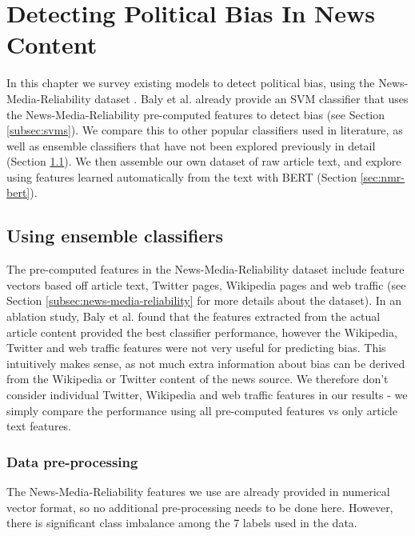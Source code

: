 \chapter{Detecting Political Bias In News Content} \label{chap:ensemble-bert}


In this chapter we survey existing models to detect political bias, using the News-Media-Reliability dataset \cite{news-media-reliability}. Baly et al. already provide an SVM classifier that uses the News-Media-Reliability pre-computed features to detect bias (see Section \ref{subsec:svms}). We compare this to other popular classifiers used in literature, as well as ensemble classifiers that have not been explored previously in detail (Section \ref{sec:nmr-ensemble}). We then assemble our own dataset of raw article text, and explore using features learned automatically from the text with BERT (Section \ref{sec:nmr-bert}).

\section{Using ensemble classifiers} \label{sec:nmr-ensemble}

The pre-computed features in the News-Media-Reliability dataset include feature vectors based off article text, Twitter pages, Wikipedia pages and web traffic (see Section \ref{subsec:news-media-reliability} for more details about the dataset). In an ablation study, Baly et al. found that the features extracted from the actual article content provided the best classifier performance, however the Wikipedia, Twitter and web traffic features were not very useful for predicting bias. This intuitively makes sense, as not much extra information about bias can be derived from the Wikipedia or Twitter content of the news source. We therefore don't consider individual Twitter, Wikipedia and web traffic features in our results - we simply compare the performance using all pre-computed features vs only article text features.

\subsection{Data pre-processing}

The News-Media-Reliability features we use are already provided in numerical vector format, so no additional pre-processing needs to be done here. However, there is significant class imbalance among the 7 labels used in the data.

